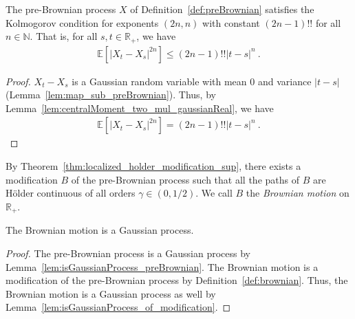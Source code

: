 \begin{lemma}\label{lem:isKolmogorovProcess_preBrownian}
  \leanok
The pre-Brownian process $X$ of Definition~\ref{def:preBrownian} satisfies the Kolmogorov condition for exponents $(2n,n)$ with constant $(2n - 1)!!$ for all $n \in \mathbb{N}$.
That is, for all $s, t \in \mathbb{R}_+$, we have
\begin{align*}
  \mathbb{E} \left[ |X_t - X_s|^{2n} \right] \le (2n - 1)!! |t - s|^n
  \: .
\end{align*}
\end{lemma}

\begin{proof}
$X_t - X_s$ is a Gaussian random variable with mean $0$ and variance $|t - s|$ (Lemma~\ref{lem:map_sub_preBrownian}).
Thus, by Lemma~\ref{lem:centralMoment_two_mul_gaussianReal}, we have
\begin{align*}
  \mathbb{E} \left[ |X_t - X_s|^{2n} \right]
  = (2n - 1)!! |t - s|^n
  \: .
\end{align*}
\end{proof}


\begin{definition}\label{def:brownian}
  \leanok
By Theorem~\ref{thm:localized_holder_modification_sup}, there exists a modification $B$ of the pre-Brownian process such that all the paths of $B$ are Hölder continuous of all orders $\gamma \in (0, 1/2)$.
We call $B$ the \emph{Brownian motion} on $\mathbb{R}_+$.
\end{definition}


\begin{lemma}\label{lem:isGaussianProcess_brownian}
  \leanok
The Brownian motion is a Gaussian process.
\end{lemma}

\begin{proof}\leanok
The pre-Brownian process is a Gaussian process by Lemma~\ref{lem:isGaussianProcess_preBrownian}.
The Brownian motion is a modification of the pre-Brownian process by Definition~\ref{def:brownian}.
Thus, the Brownian motion is a Gaussian process as well by Lemma~\ref{lem:isGaussianProcess_of_modification}.
\end{proof}


